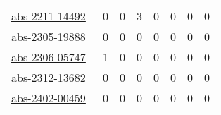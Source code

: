 {\begin{longtable}{l*{7}{r}}
\href{articles/abs-2211-14492.pdf}{abs-2211-14492}~\cite{abs-2211-14492} & 0 & 0 & 3 & 0 & 0 & 0 & 0\\
\href{articles/abs-2305-19888.pdf}{abs-2305-19888}~\cite{abs-2305-19888} & 0 & 0 & 0 & 0 & 0 & 0 & 0\\
\href{articles/abs-2306-05747.pdf}{abs-2306-05747}~\cite{abs-2306-05747} & 1 & 0 & 0 & 0 & 0 & 0 & 0\\
\href{articles/abs-2312-13682.pdf}{abs-2312-13682}~\cite{abs-2312-13682} & 0 & 0 & 0 & 0 & 0 & 0 & 0\\
\href{articles/abs-2402-00459.pdf}{abs-2402-00459}~\cite{abs-2402-00459} & 0 & 0 & 0 & 0 & 0 & 0 & 0\\
\end{longtable}
}

